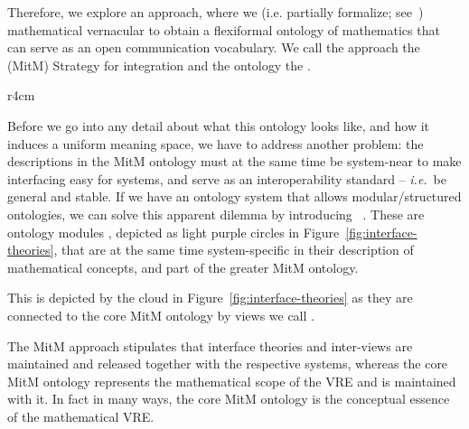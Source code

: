 Therefore, we explore an approach, where we  (i.e. partially formalize;
see~\cite{Kohlhase:tffm13}) mathematical vernacular to obtain a flexiformal ontology of
mathematics that can serve as an open communication vocabulary. We call the approach the
 (MitM) Strategy for integration and the ontology the .

\begin{wrapfigure}r{4cm}\vspace*{-1.5em}
  \vspace*{-.5em}
  \caption{Interface theories}\label{fig:interface-theories}\vspace*{-1em}
\end{wrapfigure}
Before we go into any detail about what this ontology looks like, and how it induces a uniform
meaning space, we have to address another problem: the descriptions in the MitM ontology
must at the same time be system-near to make interfacing easy for systems, and serve as
an interoperability standard -- \emph{i.e.}\ be general and stable. If we have an ontology system
that allows modular/structured ontologies, we can solve this apparent dilemma by
introducing ~\cite{KohRabSac:fvip11}. These are ontology modules
, depicted as light purple circles in Figure~\ref{fig:interface-theories}, that are at the same
time system-specific in their description of mathematical concepts, and part of the greater MitM
ontology.

This is depicted by the cloud in Figure~\ref{fig:interface-theories} as they are connected to the
core MitM ontology by views we call .

The MitM approach stipulates that interface theories and inter-views are maintained and released
together with the respective systems, whereas the core MitM ontology represents the mathematical
scope of the VRE and is maintained with it. In fact in many ways, the core MitM ontology is the
conceptual essence of the mathematical VRE.


